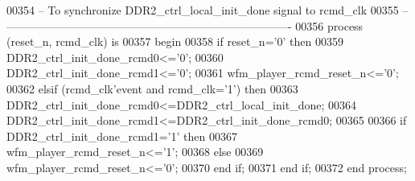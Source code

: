 \begin{DoxyCode}
00354 \textcolor{keyword}{-- To synchronize DDR2\_ctrl\_local\_init\_done signal to rcmd\_clk}
00355 \textcolor{keyword}{-- ----------------------------------------------------------------------------}
00356 \textcolor{keywordflow}{process} (reset_n, rcmd_clk) \textcolor{keywordflow}{is} 
00357 \textcolor{vhdlkeyword}{begin }
00358     \textcolor{keywordflow}{if} \textcolor{vhdlchar}{reset_n}\textcolor{vhdlchar}{=}\textcolor{vhdlchar}{'}\textcolor{vhdllogic}{}\textcolor{vhdllogic}{0}\textcolor{vhdlchar}{'} \textcolor{keywordflow}{then} 
00359         \textcolor{vhdlchar}{DDR2_ctrl_init_done_rcmd0}\textcolor{vhdlchar}{<=}\textcolor{vhdlchar}{'}\textcolor{vhdllogic}{}\textcolor{vhdllogic}{0}\textcolor{vhdlchar}{'};
00360         \textcolor{vhdlchar}{DDR2_ctrl_init_done_rcmd1}\textcolor{vhdlchar}{<=}\textcolor{vhdlchar}{'}\textcolor{vhdllogic}{}\textcolor{vhdllogic}{0}\textcolor{vhdlchar}{'};
00361         \textcolor{vhdlchar}{wfm_player_rcmd_reset_n}\textcolor{vhdlchar}{<=}\textcolor{vhdlchar}{'}\textcolor{vhdllogic}{}\textcolor{vhdllogic}{0}\textcolor{vhdlchar}{'};
00362     \textcolor{keywordflow}{elsif} \textcolor{vhdlchar}{(}\textcolor{vhdlchar}{rcmd_clk}\textcolor{vhdlchar}{'}\textcolor{vhdlkeyword}{event} \textcolor{keywordflow}{and} \textcolor{vhdlchar}{rcmd_clk}\textcolor{vhdlchar}{=}\textcolor{vhdlchar}{'}\textcolor{vhdllogic}{}\textcolor{vhdllogic}{1}\textcolor{vhdlchar}{'}\textcolor{vhdlchar}{)} \textcolor{keywordflow}{then} 
00363         \textcolor{vhdlchar}{DDR2_ctrl_init_done_rcmd0}\textcolor{vhdlchar}{<=}\textcolor{vhdlchar}{DDR2_ctrl_local_init_done};
00364         \textcolor{vhdlchar}{DDR2_ctrl_init_done_rcmd1}\textcolor{vhdlchar}{<=}\textcolor{vhdlchar}{DDR2_ctrl_init_done_rcmd0};
00365         
00366         \textcolor{keywordflow}{if} \textcolor{vhdlchar}{DDR2_ctrl_init_done_rcmd1}\textcolor{vhdlchar}{=}\textcolor{vhdlchar}{'}\textcolor{vhdllogic}{}\textcolor{vhdllogic}{1}\textcolor{vhdlchar}{'} \textcolor{keywordflow}{then} 
00367             \textcolor{vhdlchar}{wfm_player_rcmd_reset_n}\textcolor{vhdlchar}{<=}\textcolor{vhdlchar}{'}\textcolor{vhdllogic}{}\textcolor{vhdllogic}{1}\textcolor{vhdlchar}{'};
00368         \textcolor{keywordflow}{else} 
00369             \textcolor{vhdlchar}{wfm_player_rcmd_reset_n}\textcolor{vhdlchar}{<=}\textcolor{vhdlchar}{'}\textcolor{vhdllogic}{}\textcolor{vhdllogic}{0}\textcolor{vhdlchar}{'};
00370         \textcolor{keywordflow}{end} \textcolor{keywordflow}{if};
00371     \textcolor{keywordflow}{end} \textcolor{keywordflow}{if};         
00372 \textcolor{keywordflow}{end} \textcolor{keywordflow}{process};

\end{DoxyCode}
